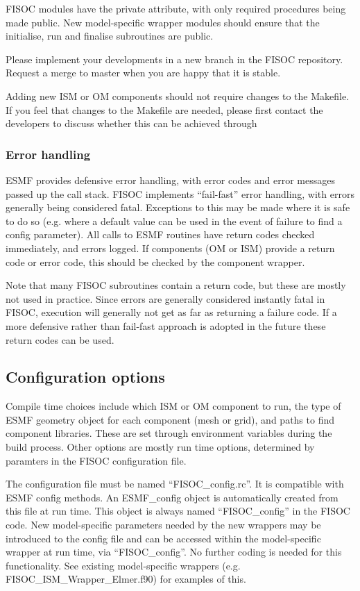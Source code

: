 \documentclass[11pt]{article}
\begin{document}
FISOC modules have the private attribute, with only required procedures being 
made public. 
New model-specific wrapper modules should ensure that the initialise, run and finalise 
subroutines are public. 

Please implement your developments in a new branch in the FISOC repository. 
Request a merge to master when you are happy that it is stable. 

Adding new ISM or OM components should not require changes to the Makefile.
If you feel that changes to the Makefile are needed, please first contact the developers
to discuss whether this can be achieved through 


\subsubsection{Error handling}

ESMF provides defensive error handling, with error codes and error messages passed up the 
call stack. 
FISOC implements ``fail-fast'' error handling, with errors generally being considered 
fatal. 
Exceptions to this may be made where it is safe to do so (e.g. where a default value can be 
used in the event of  failure to find a config parameter).
All calls to ESMF routines have return codes checked immediately, and errors logged.
If components (OM or ISM) provide a return code or error code, 
this should be checked by the component wrapper.

Note that many FISOC subroutines contain a return code, but these are mostly not used in 
practice.  Since errors are generally considered instantly fatal in FISOC, execution will 
generally not get as far as returning a failure code. 
If a more defensive rather than fail-fast approach is adopted in the future these return 
codes can be used.



\subsection{Configuration options}

Compile time choices include which ISM or OM component to run, the type of ESMF
geometry object for each component (mesh or grid), and paths to find
component libraries.
These are set through environment variables during the build process.
Other options are mostly run time options, determined by paramters in the FISOC
configuration file. 

The configuration file must be named ``FISOC\_config.rc''.  
It is compatible with ESMF config methods.  
An ESMF\_config object is automatically created from this file at run time.
This object is always named ``FISOC\_config'' in the FISOC code.
New model-specific parameters needed by the new wrappers may be 
introduced to the config file and can be accessed 
within the model-specific wrapper at run time, via  ``FISOC\_config''. 
No further coding is needed for this functionality.
See existing model-specific wrappers (e.g. FISOC\_ISM\_Wrapper\_Elmer.f90) 
for examples of this.
\end{document}
